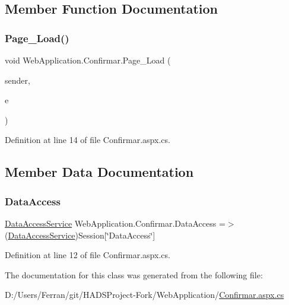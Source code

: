 \subsection{Member Function Documentation}
\mbox{\label{classWebApplication_1_1Confirmar_a0ba1fd0d9bb4844635cf79b6762cb42b}} 
\subsubsection{\texorpdfstring{Page\_Load()}{Page\_Load()}}
{\footnotesize\ttfamily void Web\+Application.\+Confirmar.\+Page\+\_\+\+Load (\begin{DoxyParamCaption}\item[{object}]{sender,  }\item[{Event\+Args}]{e }\end{DoxyParamCaption})\hspace{0.3cm}{\ttfamily [protected]}}



Definition at line 14 of file Confirmar.\+aspx.\+cs.



\subsection{Member Data Documentation}
\mbox{\label{classWebApplication_1_1Confirmar_ac2223a11ebcaa342108a44f9c8277855}} 
\subsubsection{\texorpdfstring{DataAccess}{DataAccess}}
{\footnotesize\ttfamily \mbox{\hyperlink{classDataBaseAccess_1_1DataAccessService}{Data\+Access\+Service}} Web\+Application.\+Confirmar.\+Data\+Access =$>$ (\mbox{\hyperlink{classDataBaseAccess_1_1DataAccessService}{Data\+Access\+Service}})Session\mbox{[}\char`\"{}Data\+Access\char`\"{}\mbox{]}\hspace{0.3cm}{\ttfamily [private]}}



Definition at line 12 of file Confirmar.\+aspx.\+cs.



The documentation for this class was generated from the following file\+:\begin{DoxyCompactItemize}
\item 
D\+:/\+Users/\+Ferran/git/\+H\+A\+D\+S\+Project-\/\+Fork/\+Web\+Application/\mbox{\hyperlink{Confirmar_8aspx_8cs}{Confirmar.\+aspx.\+cs}}\end{DoxyCompactItemize}
